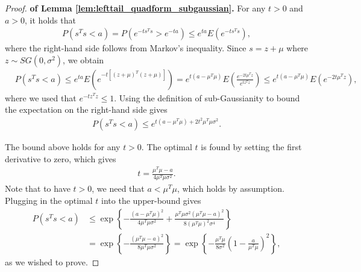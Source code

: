 \begin{proof} {\bf of Lemma \ref{lem:lefttail_quadform_subgaussian}.}
For any $t>0$ and $a>0$, it holds that
\begin{align}
 P( s^Ts < a)= P \left( e^{-t s^Ts} > e^{-t a} \right) \leq e^{ta} E(e^{-t s^Ts}),
\nonumber
\end{align}
where the right-hand side follows from Markov's inequality.
Since $s= z + \mu$ where $z \sim SG(0,\sigma^2)$, we obtain
\begin{align}
& P( s^Ts < a) \leq e^{ta} E(e^{-t [(z+\mu)^T (z+\mu)] })=
e^{t(a - \mu^T\mu)} E \left( \frac{e^{-2 t \mu^T z}}{e^{tz^T z}} \right)
\leq e^{t(a - \mu^T\mu)} E \left( e^{-2 t \mu^T z} \right),
\nonumber
\end{align}
where we used that $e^{-t z^Tz} \leq 1$.
Using the definition of sub-Gaussianity to bound the expectation on the right-hand side gives
\begin{align}
 P(s^Ts < a) \leq e^{t(a - \mu^T\mu) + 2 t^2 \mu^T\mu \sigma^2}.
\nonumber
\end{align}

The bound above holds for any $t>0$. The optimal $t$ is found by setting the first derivative to zero, which gives
\begin{align}
 t= \frac{\mu^T\mu - a}{4 \mu^T\mu \sigma^2}.
\nonumber
\end{align}
Note that to have $t>0$, we need that $a < \mu^T\mu$, which holds by assumption. Plugging in the optimal $t$ into the upper-bound gives
\begin{align}
 P(s^T s < a) &\leq 
\exp\left\{-\frac{(a-\mu^T\mu)^2}{4 \mu^T\mu \sigma^2} + \frac{\mu^T\mu \sigma^2 (\mu^T\mu - a)^2}{8 (\mu^T\mu)^2 \sigma^4}   \right\}
\nonumber \\
&=\exp\left\{-\frac{(\mu^T\mu - a)^2}{8 \mu^T\mu \sigma^2} \right\}
= \exp\left\{-\frac{\mu^T \mu}{8 \sigma^2} \left( 1 - \frac{a}{\mu^T\mu} \right)^2 \right\},
\nonumber
\end{align}
as we wished to prove.
\end{proof}


